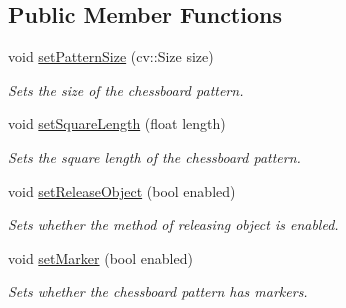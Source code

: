 \subsection*{Public Member Functions}
\begin{DoxyCompactItemize}
\item 
void \hyperlink{classstereo__ugv_1_1ChessboardLensCalibrator_aeda7a0a6538957e6174277931abf5cd4}{set\+Pattern\+Size} (cv\+::\+Size size)
\begin{DoxyCompactList}\small\item\em Sets the size of the chessboard pattern. \end{DoxyCompactList}\item 
void \hyperlink{classstereo__ugv_1_1ChessboardLensCalibrator_a232059124de2dcb4467bd2a586c75273}{set\+Square\+Length} (float length)
\begin{DoxyCompactList}\small\item\em Sets the square length of the chessboard pattern. \end{DoxyCompactList}\item 
void \hyperlink{classstereo__ugv_1_1ChessboardLensCalibrator_a438ea74bec4002b39dee1985cba88948}{set\+Release\+Object} (bool enabled)
\begin{DoxyCompactList}\small\item\em Sets whether the method of releasing object is enabled. \end{DoxyCompactList}\item 
void \hyperlink{classstereo__ugv_1_1ChessboardLensCalibrator_af2814fa1b58cdb9b2a8c3a1c46113da8}{set\+Marker} (bool enabled)
\begin{DoxyCompactList}\small\item\em Sets whether the chessboard pattern has markers. \end{DoxyCompactList}\end{DoxyCompactItemize}
